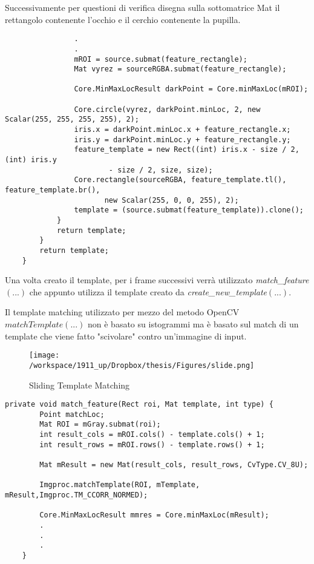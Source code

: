Successivamente per questioni di verifica disegna sulla sottomatrice Mat il rettangolo contenente l'occhio e il cerchio contenente la pupilla.\\
         
\begin{lstlisting}    
                .    
                .
                mROI = source.submat(feature_rectangle);
                Mat vyrez = sourceRGBA.submat(feature_rectangle);
               
  	            Core.MinMaxLocResult darkPoint = Core.minMaxLoc(mROI);
            
 	            Core.circle(vyrez, darkPoint.minLoc, 2, new Scalar(255, 255, 255, 255), 2);
	            iris.x = darkPoint.minLoc.x + feature_rectangle.x;
 	            iris.y = darkPoint.minLoc.y + feature_rectangle.y;
	            feature_template = new Rect((int) iris.x - size / 2, (int) iris.y
	                    - size / 2, size, size);
	            Core.rectangle(sourceRGBA, feature_template.tl(), feature_template.br(),
 	                   new Scalar(255, 0, 0, 255), 2);
	            template = (source.submat(feature_template)).clone();
            }
            return template;
        }
        return template;
    }
\end{lstlisting}

Una volta creato il template, per i frame successivi verrà utilizzato \textit{match\_feature$(...)$} che appunto utilizza il template creato da \textit{create\_new\_template$(...)$}. 

Il template matching utilizzato per mezzo del metodo OpenCV \textit{$matchTemplate(...)$} non è basato su istogrammi ma è basato sul match di un template che viene fatto "scivolare" contro un'immagine di input.\\

\begin{figure}[H]\centering  
\texttt{[image: /workspace/1911\_up/Dropbox/thesis/Figures/slide.png]}
\caption[Sliding Template Matching]{Sliding Template Matching}
\label{pic-a}
\end{figure}

\begin{lstlisting}
private void match_feature(Rect roi, Mat template, int type) {
        Point matchLoc;
        Mat ROI = mGray.submat(roi);
        int result_cols = mROI.cols() - template.cols() + 1;
        int result_rows = mROI.rows() - template.rows() + 1;
		
        Mat mResult = new Mat(result_cols, result_rows, CvType.CV_8U);
 
        Imgproc.matchTemplate(ROI, mTemplate, mResult,Imgproc.TM_CCORR_NORMED);
 
        Core.MinMaxLocResult mmres = Core.minMaxLoc(mResult);
		.
		.
		.
    }
\end{lstlisting}

